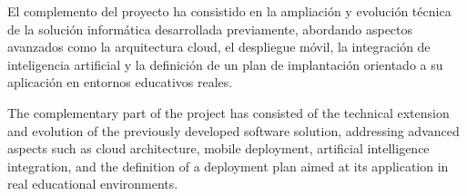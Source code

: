 El complemento del proyecto ha consistido en la ampliación y evolución técnica de la solución informática desarrollada previamente, abordando aspectos avanzados como la arquitectura cloud, el despliegue móvil, la integración de inteligencia artificial y la definición de un plan de implantación orientado a su aplicación en entornos educativos reales.

\vspace{1.5cm}

The complementary part of the project has consisted of the technical extension and evolution of the previously developed software solution, addressing advanced aspects such as cloud architecture, mobile deployment, artificial intelligence integration, and the definition of a deployment plan aimed at its application in real educational environments.
